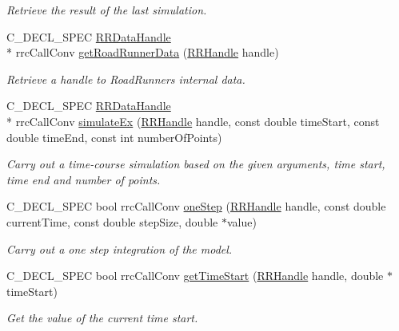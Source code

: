 \begin{DoxyCompactItemize}
\begin{DoxyCompactList}\small\item\em Retrieve the result of the last simulation. \end{DoxyCompactList}\item 
C\-\_\-\-D\-E\-C\-L\-\_\-\-S\-P\-E\-C \hyperlink{rrc__types_8h_ad0beb6fbdd576789fab9cead01d8b9e9}{R\-R\-Data\-Handle} \\*
rrc\-Call\-Conv \hyperlink{group__simulation_ga58f817560a948fbc57f4b2426980019e}{get\-Road\-Runner\-Data} (\hyperlink{rrc__types_8h_a1d68f0592372208fa5a5f2799ea4b3ae}{R\-R\-Handle} handle)
\begin{DoxyCompactList}\small\item\em Retrieve a handle to Road\-Runners internal data. \end{DoxyCompactList}\item 
C\-\_\-\-D\-E\-C\-L\-\_\-\-S\-P\-E\-C \hyperlink{rrc__types_8h_ad0beb6fbdd576789fab9cead01d8b9e9}{R\-R\-Data\-Handle} \\*
rrc\-Call\-Conv \hyperlink{group__simulation_ga320684a3df2f13afdfd2156e242ed0c2}{simulate\-Ex} (\hyperlink{rrc__types_8h_a1d68f0592372208fa5a5f2799ea4b3ae}{R\-R\-Handle} handle, const double time\-Start, const double time\-End, const int number\-Of\-Points)
\begin{DoxyCompactList}\small\item\em Carry out a time-\/course simulation based on the given arguments, time start, time end and number of points. \end{DoxyCompactList}\item 
C\-\_\-\-D\-E\-C\-L\-\_\-\-S\-P\-E\-C bool rrc\-Call\-Conv \hyperlink{group__simulation_ga8f7109b90040ff57b8366c2f1867f066}{one\-Step} (\hyperlink{rrc__types_8h_a1d68f0592372208fa5a5f2799ea4b3ae}{R\-R\-Handle} handle, const double current\-Time, const double step\-Size, double $\ast$value)
\begin{DoxyCompactList}\small\item\em Carry out a one step integration of the model. \end{DoxyCompactList}\item 
C\-\_\-\-D\-E\-C\-L\-\_\-\-S\-P\-E\-C bool rrc\-Call\-Conv \hyperlink{group__simulation_ga0d05bdfec6dd9387c64dd196ec3d880d}{get\-Time\-Start} (\hyperlink{rrc__types_8h_a1d68f0592372208fa5a5f2799ea4b3ae}{R\-R\-Handle} handle, double $\ast$time\-Start)
\begin{DoxyCompactList}\small\item\em Get the value of the current time start. \end{DoxyCompactList}\item 

\end{DoxyCompactItemize}
